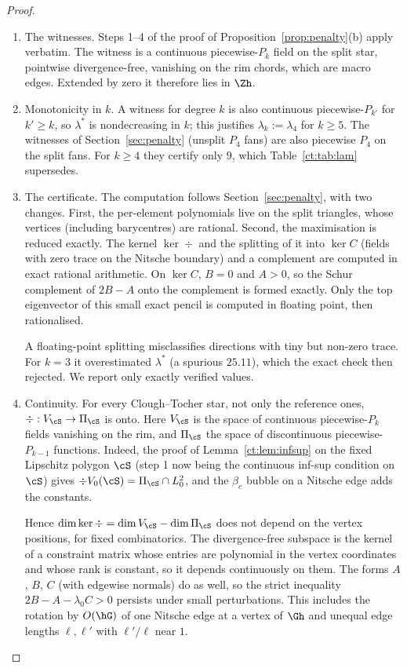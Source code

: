 \begin{proof}
\begin{enumerate}
\item The witnesses. Steps 1--4 of the proof of Proposition~\ref{prop:penalty}(b) apply verbatim. The witness is a continuous piecewise-$P_k$ field on the split star, pointwise divergence-free, vanishing on the rim chords, which are macro edges. Extended by zero it therefore lies in $\Zh$.
\item Monotonicity in $k$. A witness for degree $k$ is also continuous piecewise-$P_{k'}$ for $k'\ge k$, so $\lambda^\ast$ is nondecreasing in $k$; this justifies $\lambda_k:=\lambda_4$ for $k\ge5$. The witnesses of Section~\ref{sec:penalty} (unsplit $P_4$ fans) are also piecewise $P_4$ on the split fans. For $k\ge4$ they certify only $9$, which Table~\ref{ct:tab:lam} supersedes.
\item The certificate. The computation follows Section~\ref{sec:penalty}, with two changes. First, the per-element polynomials live on the split triangles, whose vertices (including barycentres) are rational. Second, the maximisation is reduced exactly. The kernel $\ker\div$ and the splitting of it into $\ker C$ (fields with zero trace on the Nitsche boundary) and a complement are computed in exact rational arithmetic. On $\ker C$, $B=0$ and $A>0$, so the Schur complement of $2B-A$ onto the complement is formed exactly. Only the top eigenvector of this small exact pencil is computed in floating point, then rationalised.

A floating-point splitting misclassifies directions with tiny but non-zero trace. For $k=3$ it overestimated $\lambda^\ast$ (a spurious $25.11$), which the exact check then rejected. We report only exactly verified values.
\item Continuity. For every Clough--Tocher star, not only the reference ones, $\div:V_\cS\to\Pi_\cS$ is onto. Here $V_\cS$ is the space of continuous piecewise-$P_k$ fields vanishing on the rim, and $\Pi_\cS$ the space of discontinuous piecewise-$P_{k-1}$ functions. Indeed, the proof of Lemma~\ref{ct:lem:infsup} on the fixed Lipschitz polygon $\cS$ (step 1 now being the continuous inf-sup condition on $\cS$) gives $\div V_0(\cS)=\Pi_\cS\cap L^2_0$, and the $\beta_e$ bubble on a Nitsche edge adds the constants.

Hence $\dim\ker\div=\dim V_\cS-\dim\Pi_\cS$ does not depend on the vertex positions, for fixed combinatorics. The divergence-free subspace is the kernel of a constraint matrix whose entries are polynomial in the vertex coordinates and whose rank is constant, so it depends continuously on them. The forms $A$, $B$, $C$ (with edgewise normals) do as well, so the strict inequality $2B-A-\lambda_0C>0$ persists under small perturbations. This includes the rotation by $O(\hG)$ of one Nitsche edge at a vertex of $\Gh$ and unequal edge lengths $\ell,\ell'$ with $\ell'/\ell$ near $1$.\qedhere
\end{enumerate}
\end{proof}

